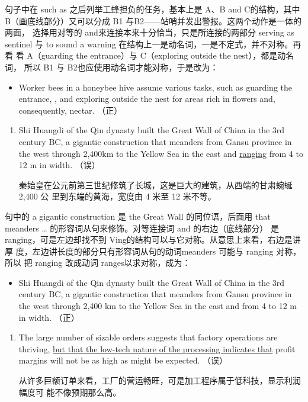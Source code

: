 句子中在 such as 之后列举工蜂担负的任务，基本上是 A、B and C的结构，其中
B（画底线部分）又可以分成 B1 与B2——站哨并发出警报。这两个动作是一体的两面，
选择用对等的 and来连接本来十分恰当，只是所连接的两部分 serving as
sentinel 与 to sound a warning 在结构上一是动名词，一是不定式，并不对称。再看
看 A（guarding the entrance）与 C（exploring outside the nest），都是动名词，
所以 B1 与 B2也应使用动名词才能对称，于是改为：
\begin{mybox}
  \begin{itemize}
  \item Worker bees in a honeybee hive assume various tasks, such as guarding
    the entrance, , and exploring outside the nest for areas rich in
    flowers and, consequently, nectar. （正）
  \end{itemize}
\end{mybox}

\begin{enumerate}[resume]
\item Shi Huangdi of the Qin dynasty built the Great Wall of China in the 3rd
  century BC, a gigantic construction that meanders from Gansu province in
  the west through 2,400km to the Yellow Sea in the east and \ul{ranging}
  from 4 to 12 m in width. （误）

  秦始皇在公元前第三世纪修筑了长城，这是巨大的建筑，从西端的甘肃蜿蜒2,400 公
  里到东端的黄海，宽度由 4 米至 12 米不等。
\end{enumerate}


句中的 a gigantic construction 是 the Great Wall 的同位语，后面用 that
meanders \ldots{} 的形容词从句来修饰。对等连接词 and 的右边（底线部分）
是ranging，可是左边却找不到 Ving的结构可以与它对称。从意思上来看，右边是讲厚
度，左边讲长度的部分只有形容词从句的动词meanders 可能与 ranging 对称，所以
把 ranging 改成动词 ranges以求对称，成为：
\begin{mybox}
  \begin{itemize}
  \item Shi Huangdi of the Qin dynasty built the Great Wall of China in the 3rd
    century BC, a gigantic construction that meanders from Gansu province in
    the west through 2,400 km to the Yellow Sea in the east and
     from 4 to 12 m in width. （正）
  \end{itemize}
\end{mybox}

\begin{enumerate}[resume]
\item The large number of sizable orders suggests that factory operations are
  thriving, \ul{but that the low-tech nature of the processing indicates
    that} profit margins will not be as high as might be expected. （误）

  从许多巨额订单来看，工厂的营运畅旺，可是加工程序属于低科技，显示利润幅度可
  能不像预期那么高。
\end{enumerate}

